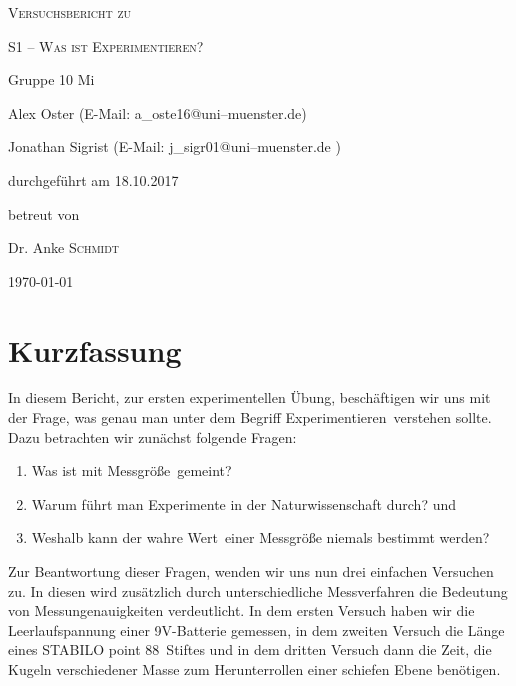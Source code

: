 \documentclass[11pt,a4paper,titlepage, ngerman]{article}
\begin{document}
	
\begin{titlepage}
	\centering
	{\scshape\LARGE Versuchsbericht zu \par}
	\vspace{1cm}
	{\scshape\huge S1 -- Was ist Experimentieren?\par}
	\vspace{2.5cm}
	{\LARGE Gruppe 10 Mi\par}
	\vspace{0.5cm}
	{\large Alex Oster (E-Mail: a\_oste16@uni--muenster.de) \par}
	{\large Jonathan Sigrist (E-Mail: j\_sigr01@uni--muenster.de ) \par}
	\vfill
	durchgeführt am 18.10.2017\par
	betreut von\par
	{\large Dr. Anke \textsc{Schmidt}}

	\vfill

	{\large \today\par}
\end{titlepage}


\tableofcontents

\newpage

\section{Kurzfassung}
	In diesem Bericht, zur ersten experimentellen Übung, beschäftigen wir uns mit der Frage, was genau man unter dem Begriff \glqq Experimentieren\grqq\ verstehen sollte. Dazu betrachten wir zunächst folgende Fragen:
	
	\begin{enumerate}
		 \item Was ist mit \glqq Messgröße\grqq\ gemeint?
		 \item Warum führt man Experimente in der Naturwissenschaft durch? und
		 \item Weshalb kann der \glqq wahre Wert\grqq\ einer Messgröße niemals bestimmt werden?
	\end{enumerate}

	Zur Beantwortung dieser Fragen, wenden wir uns nun drei einfachen Versuchen zu. In diesen wird zusätzlich durch unterschiedliche Messverfahren die Bedeutung von Messungenauigkeiten verdeutlicht. In dem ersten Versuch haben wir die Leerlaufspannung einer 9V-Batterie gemessen, in dem zweiten Versuch die Länge eines \glqq STABILO point 88\grqq\ Stiftes und in dem dritten Versuch dann die Zeit, die Kugeln verschiedener Masse zum Herunterrollen einer schiefen Ebene benötigen.
	
\end{document}
